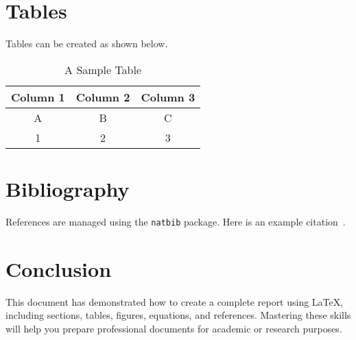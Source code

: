\documentclass[12pt,a4paper]{article} %
\begin{document}
\section{Tables}
Tables can be created as shown below.

\begin{table}[h]
    \centering
    \begin{tabular}{|c|c|c|}
    \hline
    Column 1 & Column 2 & Column 3 \\ \hline
    A        & B        & C        \\ \hline
    1        & 2        & 3        \\ \hline
    \end{tabular}
    \caption{A Sample Table}
    \label{tab:sample}
\end{table}

\section{Bibliography}
References are managed using the \texttt{natbib} package. Here is an example citation~\citep{shor1994}.




\newpage
\pagestyle{fancy}
\fancyhf{}
\fancyfoot[C]{\thepage}

\section{Conclusion}
This document has demonstrated how to create a complete report using \LaTeX, including sections, tables, figures, equations, and references. Mastering these skills will help you prepare professional documents for academic or research purposes.
\end{document}
